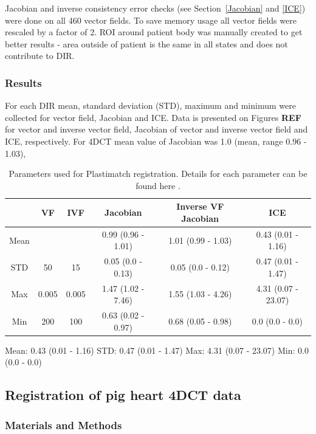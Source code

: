 \documentclass[type=dr, dr=rernat, accentcolor=tud7b,colorbacktitle, bigchapter, openright, twoside, 12pt ]{tudthesis}
\begin{document}
Jacobian and inverse consistency error checks (see Section~\ref{Jacobian} and \ref{ICE}) were done on all 460 vector fields. To save memory usage all vector fields were rescaled by a factor of 2. ROI around patient body was manually created to
get better results - area outside of patient is the same in all states and does not contribute to DIR.

\subsubsection{Results}

For each DIR mean, standard deviation (STD), maximum and minimum were collected for vector field, Jacobian and ICE. Data is presented on Figures \textbf{REF} for vector and inverse vector field, Jacobian of vector and inverse vector field and ICE, respectively.
For 4DCT mean value of Jacobian was 1.0 (mean, range 0.96 - 1.03), 

\begin{table}[H]
  \centering
  \caption{Parameters used for Plastimatch registration. Details for each parameter can be found here \cite{Plastimatch}.}
  \begin{tabular}{c|c|c|c|c|c}
       & VF & IVF & Jacobian & Inverse VF Jacobian & ICE \\
      \hline
      Mean &  & & 0.99 (0.96 - 1.01) & 1.01 (0.99 - 1.03) & 0.43 (0.01 - 1.16)\\
      STD & 50 & 15 & 0.05 (0.0 - 0.13) & 0.05 (0.0 - 0.12) &  0.47 (0.01 - 1.47)\\
      Max & 0.005 & 0.005 & 1.47 (1.02 - 7.46) & 1.55 (1.03 - 4.26) & 4.31 (0.07 - 23.07)\\
      Min & 200 & 100 & 0.63 (0.02 - 0.97) & 0.68 (0.05 - 0.98) & 0.0 (0.0 - 0.0) \\
    \hline\hline
  \end{tabular}
  \label{tab:stages}
\end{table}

Mean: 0.43 (0.01 - 1.16)
STD: 0.47 (0.01 - 1.47)
Max: 4.31 (0.07 - 23.07)
Min: 0.0 (0.0 - 0.0)

\subsection{Registration of pig heart 4DCT data}

\subsubsection{Materials and Methods}
\end{document}
